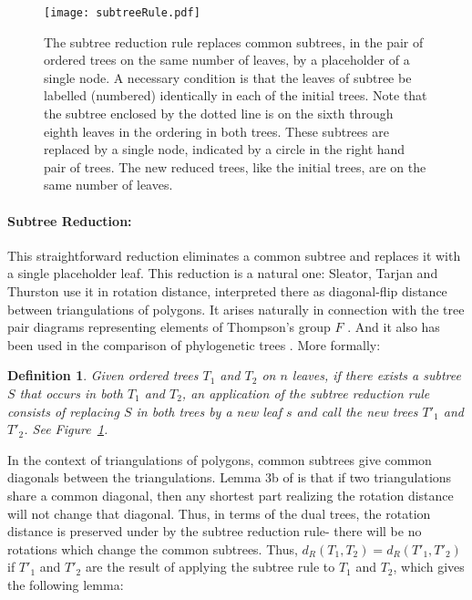 \documentclass[12pt]{article}
\newtheorem{definition}{Definition}
\begin{document}
\begin{figure}

\begin{center}
\texttt{[image: subtreeRule.pdf]}
\end{center}
\caption{\small The subtree reduction rule replaces common subtrees, in the pair of ordered
trees on the same number of leaves, 
by a placeholder of a single node.  A necessary condition is that the leaves of
subtree be labelled (numbered) identically in each of the initial trees.  Note that the subtree enclosed
by the dotted line is on the sixth through eighth leaves in the ordering in both trees.
These subtrees are replaced by a single node, indicated by a circle in the right hand
pair of trees.  The new reduced trees, like the initial trees, are on the same number
of leaves. }
\label{subtreeRuleFigure}
\end{figure}


\paragraph{Subtree Reduction:}  This straightforward reduction eliminates a
common subtree and replaces it with a single placeholder leaf.
This reduction is a natural one: Sleator, Tarjan and Thurston \cite{stt}
use it in rotation distance, interpreted there as diagonal-flip distance between triangulations of polygons.
It arises naturally in connection with the tree pair diagrams representing elements of Thompson's group $F$ \cite{rotipl}.
And it also has been used in the comparison of phylogenetic trees 
\cite{allenSteel}. 
More formally:
\begin{definition}
Given ordered trees $T_1$ and $T_2$ on $n$
leaves, if 
there exists a subtree $S$ that occurs in both $T_1$
and $T_2$, an application of the {\em subtree reduction rule} consists of replacing 
$S$ in both trees by a new leaf $s$ and 
call the new trees $T'_1$ and $T'_2$.  See 
Figure~\ref{subtreeRuleFigure}.  
\end{definition}

In the context of triangulations of polygons, common subtrees give common diagonals between the triangulations.
Lemma 3b of
\cite{stt} is that if two triangulations share a common diagonal, then any shortest part realizing the rotation distance will
not change that diagonal. Thus, in terms of the dual trees, the rotation distance is preserved 
under by the subtree reduction rule- there will be no rotations which change the common subtrees.  Thus, 
$d_{R}(T_1,T_2) = d_{R}(T'_1,T'_2)$ if $T'_1$ and $T'_2$ 
are the result of applying the subtree rule to $T_1$ and $T_2$, which gives the following lemma:
\end{document}
